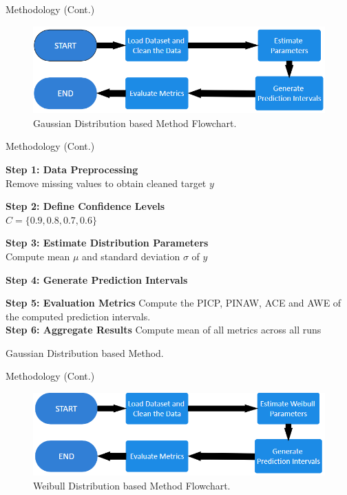 \documentclass[xcolor=dvipsnames,aspectratio=169]{beamer}
\begin{document}
\begin{frame}{Methodology (Cont.)}
\begin{figure}
    \centering
    \includegraphics[width=0.6\linewidth]{GD.png}
    \caption{Gaussian Distribution based Method Flowchart.}
    \label{fig:enter-label}
\end{figure}
\end{frame}

\begin{frame}{Methodology (Cont.)}
        \begin{algorithm}[H]
        \tiny
        \SetAlgoCaptionSeparator{:}
    
        \textbf{Step 1: Data Preprocessing}\\
        Remove missing values to obtain cleaned target $y$
    
        \textbf{Step 2: Define Confidence Levels}\\
        $C = \{0.9, 0.8, 0.7, 0.6\}$
    
        \textbf{Step 3: Estimate Distribution Parameters}\\
        Compute mean $\mu$ and standard deviation $\sigma$ of $y$
    
        \textbf{Step 4: Generate Prediction Intervals}\\
    
        \textbf{Step 5: Evaluation Metrics} Compute the PICP, PINAW, ACE and AWE of the computed prediction intervals.\\
        \textbf{Step 6: Aggregate Results} Compute mean of all metrics across all runs 
        \caption{Gaussian Distribution based Method.}
        \end{algorithm}

\end{frame}

\begin{frame}{Methodology (Cont.)}
\begin{figure}
    \centering
    \includegraphics[width=0.6\linewidth]{WD.png}
    \caption{Weibull Distribution based Method Flowchart.}
    \label{fig:enter-label}
\end{figure}
\end{frame}
\end{document}
